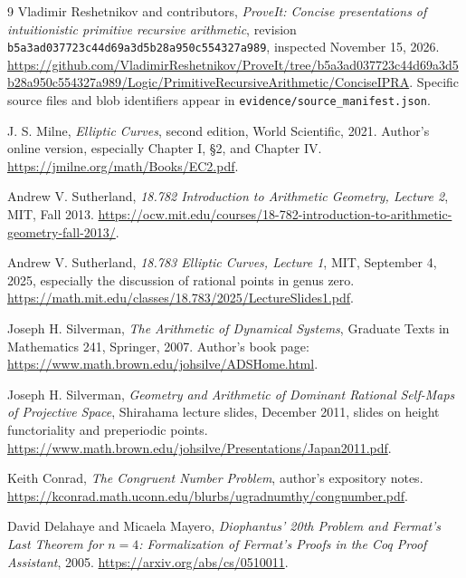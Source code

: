 \documentclass[11pt,letterpaper]{article}
\theoremstyle{definition}
\theoremstyle{remark}
\numberwithin{equation}{section}
\begin{document}
\clearpage
\begin{thebibliography}{9}
Vladimir Reshetnikov and contributors,
\emph{ProveIt: Concise presentations of intuitionistic primitive recursive arithmetic},
revision \texttt{b5a3ad037723c44d69a3d5b28a950c554327a989}, inspected November 15, 2026.
\url{https://github.com/VladimirReshetnikov/ProveIt/tree/b5a3ad037723c44d69a3d5b28a950c554327a989/Logic/PrimitiveRecursiveArithmetic/ConciseIPRA}.
Specific source files and blob identifiers appear in \texttt{evidence/source\_manifest.json}.

J. S. Milne, \emph{Elliptic Curves}, second edition, World Scientific, 2021.
Author's online version, especially Chapter I, \S2, and Chapter IV.
\url{https://jmilne.org/math/Books/EC2.pdf}.

Andrew V. Sutherland, \emph{18.782 Introduction to Arithmetic Geometry,
Lecture 2}, MIT, Fall 2013.
\url{https://ocw.mit.edu/courses/18-782-introduction-to-arithmetic-geometry-fall-2013/}.

Andrew V. Sutherland, \emph{18.783 Elliptic Curves, Lecture 1},
MIT, September 4, 2025, especially the discussion of rational points in genus zero.
\url{https://math.mit.edu/classes/18.783/2025/LectureSlides1.pdf}.

Joseph H. Silverman, \emph{The Arithmetic of Dynamical Systems},
Graduate Texts in Mathematics 241, Springer, 2007.
Author's book page: \url{https://www.math.brown.edu/johsilve/ADSHome.html}.

Joseph H. Silverman, \emph{Geometry and Arithmetic of Dominant Rational
Self-Maps of Projective Space}, Shirahama lecture slides, December 2011,
slides on height functoriality and preperiodic points.
\url{https://www.math.brown.edu/johsilve/Presentations/Japan2011.pdf}.

Keith Conrad, \emph{The Congruent Number Problem}, author's expository notes.
\url{https://kconrad.math.uconn.edu/blurbs/ugradnumthy/congnumber.pdf}.

David Delahaye and Micaela Mayero,
\emph{Diophantus' 20th Problem and Fermat's Last Theorem for $n=4$:
Formalization of Fermat's Proofs in the Coq Proof Assistant}, 2005.
\url{https://arxiv.org/abs/cs/0510011}.
\end{thebibliography}
\end{document}
